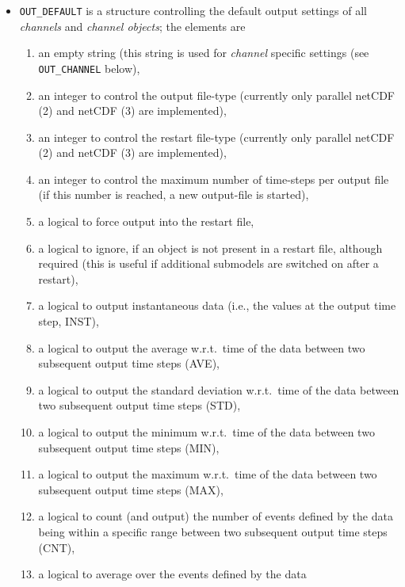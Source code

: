 \documentclass[twoside]{article}
\begin{document}
{\begin{itemize}
       Example: {\tt OUT\_PREC = 1,2,1,1,1,1,}
 \item {\tt OUT\_DEFAULT} is a structure controlling the default output
       settings of all {\it channels} and {\it channel objects};
       the elements are
       \begin{enumerate}
        \item an empty string (this string is used for {\it channel} specific
              settings (see {\tt OUT\_CHANNEL} below),
        \item an integer to control the output file-type (currently only
              parallel netCDF (2) and netCDF (3) are implemented),
        \item an integer to control the restart file-type (currently only
              parallel netCDF (2) and netCDF (3) are implemented),
        \item an integer to control the maximum number of time-steps
              per output file (if this number is reached, a new output-file
              is started),
        \item a logical to force output into the restart file,
        \item a logical to ignore, if an object is not present in a restart
              file, although required (this is useful if additional submodels
              are switched on after a restart),
        \item a logical to output instantaneous data (i.e., the values at
              the output time step, INST),
        \item a logical to output the average w.r.t.\ time
              of the data between two subsequent output time steps (AVE),
        \item a logical to output the standard deviation w.r.t.\ time
              of the data between two subsequent output time steps (STD),
        \item a logical to output the minimum w.r.t.\ time
              of the data between two subsequent output time steps (MIN),
        \item a logical to output the maximum w.r.t.\ time
              of the data between two subsequent output time steps (MAX),
        \item a logical to count (and output) the number of events
              defined by the data being within a specific range
              between two subsequent output time steps (CNT),
        \item a logical to average over the events defined by the data

\end{enumerate}
\end{itemize}}
\end{document}
